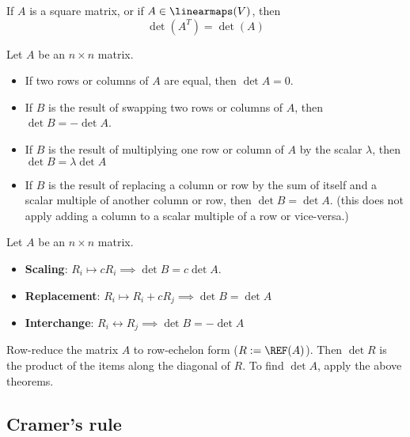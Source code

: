 \begin{theorem}
  If $A$ is a square matrix, or if $A \in \linearmaps(V)$, then
  \[
    \det(A^T) = \det(A)
  \]
\end{theorem}

\begin{theorem}
  Let $A$ be an $n \times n$ matrix.
  \begin{itemize}
    \item If two rows or columns of $A$ are equal, then $\det A = 0$.
    \item If $B$ is the result of swapping two rows or columns of $A$, then $\det B = - \det A$.
    \item If $B$ is the result of multiplying one row or column of $A$ by the scalar $\lambda$, then $\det B = \lambda \det A$
    \item If $B$ is the result of replacing a column or row by the sum of itself and a scalar multiple of another column or row, then $\det B = \det A$. (this does not apply adding a column to a scalar multiple of a row or vice-versa.)
  \end{itemize}
\end{theorem}

\begin{theorem}
  Let $A$ be an $n \times n$ matrix.
  \begin{itemize}
    \item \textbf{Scaling}: $R_i \mapsto cR_i \implies \det B = c \det A$.
    \item \textbf{Replacement}: $R_i \mapsto R_i + cR_j \implies \det B = \det A$
    \item \textbf{Interchange}: $R_i \leftrightarrow R_j \implies \det B = - \det A$
  \end{itemize}
\end{theorem}

\begin{procedure}
  Row-reduce the matrix $A$ to row-echelon form ($R := \REF(A)$). Then $\det R$ is the product of the items along the diagonal of $R$. To find $\det A$, apply the above theorems.
\end{procedure}

\subsection{Cramer's rule}

